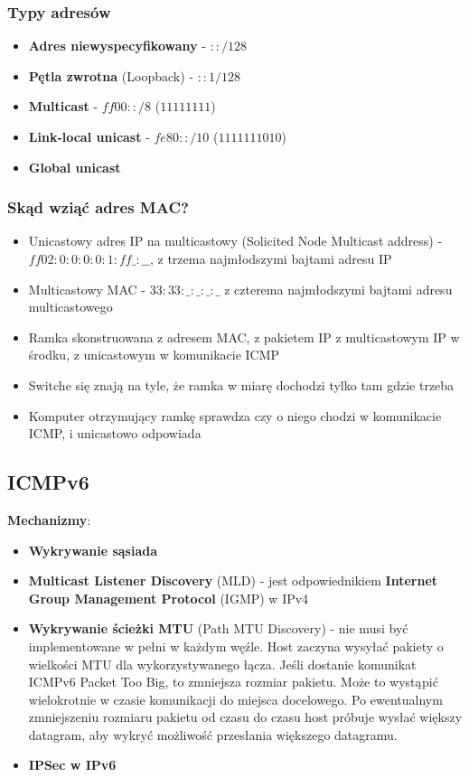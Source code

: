 \documentclass[../main.tex]{subfiles}
\begin{document}
    \subsubsection{Typy adresów}
    \begin{itemize}
        \item \textbf{Adres niewyspecyfikowany} - $::/128$
        \item \textbf{Pętla zwrotna} (Loopback) - $::1/128$
        \item \textbf{Multicast} - $ff00::/8$ ($1111 1111$)
        \item \textbf{Link-local unicast} - $fe80::/10$ ($1111 1110 10$)
        \item \textbf{Global unicast}
    \end{itemize}


    \subsubsection{Skąd wziąć adres MAC?}
    \begin{itemize}
        \item Unicastowy adres IP na multicastowy (Solicited Node Multicast address) - $ff02:0:0:0:0:1:ff\_:\_\_$,
        z trzema najmłodszymi bajtami adresu IP
        \item Multicastowy MAC - $33:33:\_:\_:\_:\_$ z czterema najmłodszymi bajtami adresu multicastowego
        \item Ramka skonstruowana z adresem MAC, z pakietem IP z multicastowym IP w środku, z unicastowym w komunikacie ICMP
        \item Switche się znają na tyle, że ramka w miarę dochodzi tylko tam gdzie trzeba
        \item Komputer otrzymujący ramkę sprawdza czy o niego chodzi w komunikacie ICMP, i unicastowo odpowiada
    \end{itemize}

    \subsection{ICMPv6}
    \textbf{Mechanizmy}:
    \begin{itemize}
        \item \textbf{Wykrywanie sąsiada}
        \item \textbf{Multicast Listener Discovery} (MLD) - jest odpowiednikiem \textbf{Internet Group Management Protocol} (IGMP) w IPv4
        \item \textbf{Wykrywanie ścieżki MTU} (Path MTU Discovery) - nie musi być implementowane w pełni w każdym węźle.
        Host zaczyna wysyłać pakiety o wielkości MTU dla wykorzystywanego łącza.
        Jeśli dostanie komunikat ICMPv6 Packet Too Big, to zmniejsza rozmiar pakietu.
        Może to wystąpić wielokrotnie w czasie komunikacji do miejsca docelowego.
        Po ewentualnym zmniejszeniu rozmiaru pakietu od czasu do czasu host próbuje wysłać
        większy datagram, aby wykryć możliwość przesłania większego datagramu.
        \item \textbf{IPSec w IPv6}
    \end{itemize}
\end{document}
